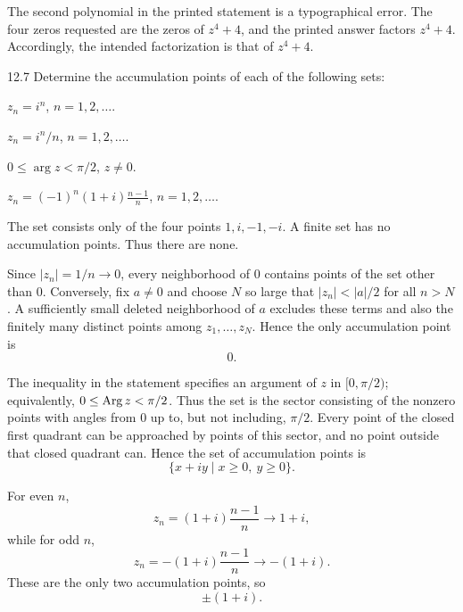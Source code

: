 \documentclass[11pt,oneside]{article}
\begin{document}
\begin{remark}
The second polynomial in the printed statement is a typographical error. The four zeros requested are the zeros of \(z^4+4\), and the printed answer factors \(z^4+4\). Accordingly, the intended factorization is that of \(z^4+4\).
\end{remark}

\begin{exercise}{12.7}
Determine the accumulation points of each of the following sets:
\begin{exercisesubparts}
    \item \(z_n=i^n\), \(n=1, 2, \ldots\).
    \item \(z_n=i^n/n\), \(n=1, 2, \ldots\).
    \item \(0\le \arg z<\pi/2\), \(z\ne0\).
    \item \(\displaystyle z_n=(-1)^n(1+i)\frac{n-1}{n}\), \(n=1, 2, \ldots\).
\end{exercisesubparts}
\end{exercise}

\begin{solution}
\begin{exercisesubparts}
    \item The set consists only of the four points \(1, i, -1, -i\). A finite set has no accumulation points. Thus there are none.

    \item Since \(|z_n|=1/n\to0\), every neighborhood of \(0\) contains points of the set other than \(0\). Conversely, fix \(a\ne0\) and choose \(N\) so large that \(|z_n|<|a|/2\) for all \(n>N\). A sufficiently small deleted neighborhood of \(a\) excludes these terms and also the finitely many distinct points among \(z_1, \ldots, z_N\). Hence the only accumulation point is
    \[
        \boxed{0}.
    \]

    \item The inequality in the statement specifies an argument of \(z\) in \([0, \pi/2)\); equivalently, \(0\le\operatorname{Arg} z<\pi/2\). Thus the set is the sector consisting of the nonzero points with angles from \(0\) up to, but not including, \(\pi/2\). Every point of the closed first quadrant can be approached by points of this sector, and no point outside that closed quadrant can. Hence the set of accumulation points is
    \[
        \boxed{\{x+iy\mid x\ge0, \ y\ge0\}}.
    \]

    \item For even \(n\),
    \[
        z_n=(1+i)\frac{n-1}{n}\longrightarrow 1+i,
    \]
    while for odd \(n\),
    \[
        z_n=-(1+i)\frac{n-1}{n}\longrightarrow -(1+i).
    \]
    These are the only two accumulation points, so
    \[
        \boxed{\pm(1+i)}.
    \]
\end{exercisesubparts}
\end{solution}
\end{document}

